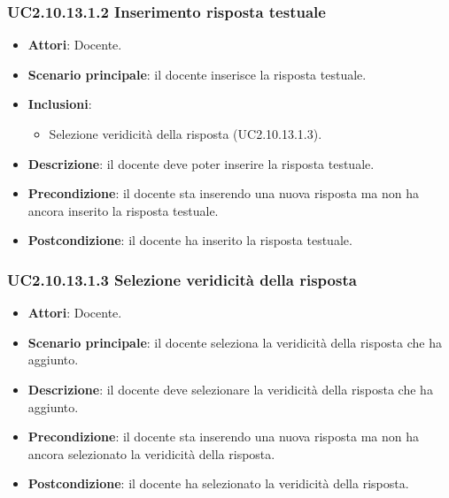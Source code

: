 \subsubsection{UC2.10.13.1.2 Inserimento risposta testuale}
\begin{itemize}
\item \textbf{Attori}: Docente.
\item \textbf{Scenario principale}: il docente inserisce la risposta testuale.
\item \textbf{Inclusioni}:
\begin{itemize}
\item Selezione veridicità della risposta (UC2.10.13.1.3).
\end{itemize}
\item \textbf{Descrizione}: il docente deve poter inserire la risposta testuale.
\item \textbf{Precondizione}: il docente sta inserendo una nuova risposta ma non ha ancora inserito la risposta testuale.
\item \textbf{Postcondizione}: il docente ha inserito la risposta testuale.
\end{itemize}
\subsubsection{UC2.10.13.1.3 Selezione veridicità della risposta}
\begin{itemize}
\item \textbf{Attori}: Docente.
\item \textbf{Scenario principale}: il docente seleziona la veridicità della risposta che ha aggiunto.
\item \textbf{Descrizione}: il docente deve selezionare la veridicità della risposta che ha aggiunto.
\item \textbf{Precondizione}: il docente sta inserendo una nuova risposta ma non ha ancora selezionato la veridicità della risposta.
\item \textbf{Postcondizione}: il docente ha selezionato la veridicità della risposta.
\end{itemize}
